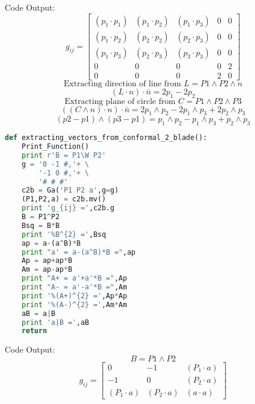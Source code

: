 \documentclass[10pt,fleqn]{report}
\newcommand{\W}{\wedge}
\begin{document}
Code Output:
\begin{equation*} g_{ij} = \left[\begin{matrix}\left ( p_{1}\cdot p_{1}\right )  & \left ( p_{1}\cdot p_{2}\right )  & \left ( p_{1}\cdot p_{3}\right )  & 0 & 0\\\left ( p_{1}\cdot p_{2}\right )  & \left ( p_{2}\cdot p_{2}\right )  & \left ( p_{2}\cdot p_{3}\right )  & 0 & 0\\\left ( p_{1}\cdot p_{3}\right )  & \left ( p_{2}\cdot p_{3}\right )  & \left ( p_{3}\cdot p_{3}\right )  & 0 & 0\\0 & 0 & 0 & 0 & 2\\0 & 0 & 0 & 2 & 0\end{matrix}\right] \end{equation*}
\begin{equation*} \text{Extracting direction of line from }L = P1\W P2\W n \end{equation*}
\begin{equation*} (L\cdot n)\cdot \bar{n} = 2 p_{1} -2 p_{2} \end{equation*}
\begin{equation*} \text{Extracting plane of circle from }C = P1\W P2\W P3 \end{equation*}
\begin{equation*} ((C\W n)\cdot n)\cdot \bar{n}= 2 p_{1}\wedge p_{2} -2 p_{1}\wedge p_{3} + 2 p_{2}\wedge p_{3} \end{equation*}
\begin{equation*} (p2-p1)\W (p3-p1)=  p_{1}\wedge p_{2} - p_{1}\wedge p_{3} + p_{2}\wedge p_{3} \end{equation*}
\begin{lstlisting}[language=Python,showspaces=false,showstringspaces=false,backgroundcolor=\color{gray},frame=single]
def extracting_vectors_from_conformal_2_blade():
    Print_Function()
    print r'B = P1\W P2'
    g = '0 -1 #,'+ \
        '-1 0 #,'+ \
        '# # #'
    c2b = Ga('P1 P2 a',g=g)
    (P1,P2,a) = c2b.mv()
    print 'g_{ij} =',c2b.g
    B = P1^P2
    Bsq = B*B
    print '%B^{2} =',Bsq
    ap = a-(a^B)*B
    print "a' = a-(a^B)*B =",ap
    Ap = ap+ap*B
    Am = ap-ap*B
    print "A+ = a'+a'*B =",Ap
    print "A- = a'-a'*B =",Am
    print '%(A+)^{2} =',Ap*Ap
    print '%(A-)^{2} =',Am*Am
    aB = a|B
    print 'a|B =',aB
    return
\end{lstlisting}
Code Output:
\begin{equation*} B = P1\W P2 \end{equation*}
\begin{equation*} g_{ij} = \left[\begin{matrix}0 & -1 & \left ( P_{1}\cdot a\right ) \\-1 & 0 & \left ( P_{2}\cdot a\right ) \\\left ( P_{1}\cdot a\right )  & \left ( P_{2}\cdot a\right )  & \left ( a\cdot a\right ) \end{matrix}\right] \end{equation*}
\end{document}

